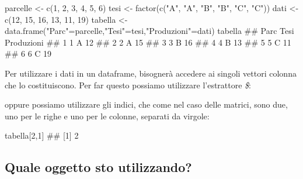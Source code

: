 \documentclass[a4paper,12pt,oneside]{book}
\newenvironment{Shaded}{}{}
\newcommand{\KeywordTok}[1]{#1}
\newcommand{\DecValTok}[1]{#1}
\newcommand{\StringTok}[1]{#1}
\newcommand{\CommentTok}[1]{#1}
\newcommand{\OperatorTok}[1]{#1}
\newcommand{\NormalTok}[1]{#1}
\begin{document}
\begin{Shaded}
\begin{Highlighting}[]
\NormalTok{parcelle  <-}\StringTok{  }\KeywordTok{c}\NormalTok{(}\DecValTok{1}\NormalTok{, }\DecValTok{2}\NormalTok{, }\DecValTok{3}\NormalTok{, }\DecValTok{4}\NormalTok{, }\DecValTok{5}\NormalTok{, }\DecValTok{6}\NormalTok{)}
\NormalTok{tesi  <-}\StringTok{  }\KeywordTok{factor}\NormalTok{(}\KeywordTok{c}\NormalTok{(}\StringTok{"A"}\NormalTok{, }\StringTok{"A"}\NormalTok{, }\StringTok{"B"}\NormalTok{, }\StringTok{"B"}\NormalTok{, }\StringTok{"C"}\NormalTok{, }\StringTok{"C"}\NormalTok{))}
\NormalTok{dati  <-}\StringTok{  }\KeywordTok{c}\NormalTok{(}\DecValTok{12}\NormalTok{, }\DecValTok{15}\NormalTok{, }\DecValTok{16}\NormalTok{, }\DecValTok{13}\NormalTok{, }\DecValTok{11}\NormalTok{, }\DecValTok{19}\NormalTok{)}
\NormalTok{tabella  <-}\StringTok{  }\KeywordTok{data.frame}\NormalTok{(}\StringTok{"Parc"}\NormalTok{=parcelle,}\StringTok{"Tesi"}\NormalTok{=tesi,}\StringTok{"Produzioni"}\NormalTok{=dati)}
\NormalTok{tabella}
\CommentTok{##   Parc Tesi Produzioni}
\CommentTok{## 1    1    A         12}
\CommentTok{## 2    2    A         15}
\CommentTok{## 3    3    B         16}
\CommentTok{## 4    4    B         13}
\CommentTok{## 5    5    C         11}
\CommentTok{## 6    6    C         19}
\end{Highlighting}
\end{Shaded}

Per utilizzare i dati in un dataframe, bisognerà accedere ai singoli vettori colonna che lo costituiscono. Per far questo possiamo utilizzare l'estrattore \emph{\$}:

\begin{Shaded}
\end{Shaded}

oppure possiamo utilizzare gli indici, che come nel caso delle matrici, sono due, uno per le righe e uno per le colonne, separati da virgole:

\begin{Shaded}
\begin{Highlighting}[]
\NormalTok{tabella[}\DecValTok{2}\NormalTok{,}\DecValTok{1}\NormalTok{]}
\CommentTok{## [1] 2}
\end{Highlighting}
\end{Shaded}

\hypertarget{quale-oggetto-sto-utilizzando}{%
\subsection*{Quale oggetto sto utilizzando?}\label{quale-oggetto-sto-utilizzando}}
\end{document}

